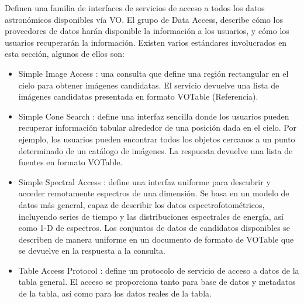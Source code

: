 Definen una familia de interfaces de servicios de acceso a todos los datos
astronómicos disponibles vía VO.  El grupo de Data Access, describe cómo los
proveedores de datos harán disponible la información a los usuarios, y cómo los
usuarios recuperarán la información. Existen varios estándares involucrados
en esta sección, algunos de ellos son:

\begin{itemize}
	\item Simple Image Access \cite{sia}: una consulta que define una región
rectangular en el cielo para obtener imágenes candidatas. El servicio devuelve
una lista de imágenes candidatas presentada en formato VOTable (Referencia).
	\item Simple Cone Search \cite{scs}: define una interfaz sencilla donde los
usuarios pueden recuperar información tabular alrededor de una posición dada en
el cielo. Por ejemplo, los usuarios pueden encontrar todos los objetos cercanos
a un punto determinado de un catálogo de imágenes. La respuesta devuelve una
lista de fuentes en formato VOTable.
	\item Simple Spectral Access \cite{ssa}: define una interfaz uniforme para
descubrir y acceder remotamente espectros de una dimensión. Se basa en un
modelo de datos más general, capaz de describir los datos espectrofotométricos,
incluyendo series de tiempo y las distribuciones espectrales de energía, así
como 1-D de espectros. Los conjuntos de datos de candidatos disponibles se
describen de manera uniforme en un documento de formato de VOTable que se
devuelve en la respuesta a la consulta.
	\item Table Access Protocol \cite{tap}: define un protocolo de servicio de acceso
a datos de la tabla general. El acceso se proporciona tanto para base de datos
y metadatos de la tabla, así como para los datos reales de la tabla.
\end{itemize}
